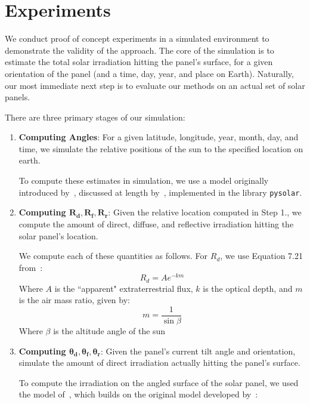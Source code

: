 \documentclass[11pt]{article}
\begin{document}
\section{Experiments}

We conduct proof of concept experiments in a simulated environment to demonstrate the validity of the approach. The core of the simulation is to estimate the total solar irradiation hitting the panel's surface, for a given orientation of the panel (and a time, day, year, and place on Earth). Naturally, our most immediate next step is to evaluate our methods on an actual set of solar panels.

There are three primary stages of our simulation:
\begin{enumerate}
\item {\bf Computing Angles}: For a given latitude, longitude, year, month, day, and time, we simulate the relative positions of the sun to the specified location on earth.

To compute these estimates in simulation, we use a model originally introduced by~\citet{jordan1958chafer}, discussed at length by~\citet{masters2013renewable}, implemented in the library \texttt{pysolar}.

\item {\bf Computing $\pmb{R_d, R_f, R_r}$}: Given the relative location computed in Step 1., we compute the amount of direct, diffuse, and reflective irradiation hitting the solar panel's location.

We compute each of these quantities as follows. For $R_d$, we use Equation 7.21 from~\citet{masters2013renewable}:
\begin{equation}
R_d = A e^{-km}
\end{equation}
Where $A$ is the ``apparent" extraterrestrial flux, $k$ is the optical depth, and $m$ is the air mass ratio, given by:
\begin{equation}
m = \frac{1}{\sin \beta}
\end{equation}
Where $\beta$ is the altitude angle of the sun

\item {\bf Computing $\pmb{\theta_d, \theta_f, \theta_r}$}: Given the panel's current tilt angle and orientation, simulate the amount of direct irradiation actually hitting the panel's surface.

To compute the irradiation on the angled surface of the solar panel, we used the model of~\citet{andersen1980comments}, which builds on the original model developed by~\citet{klein1977calculation}:


\end{enumerate}
\end{document}

